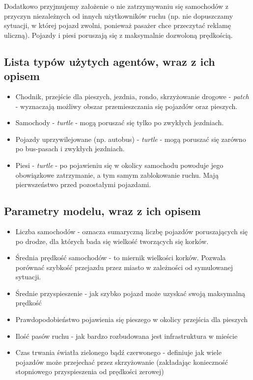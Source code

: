 \documentclass{article}
\begin{document}
Dodatkowo przyjmujemy założenie o nie zatrzymywaniu się samochodów z przyczyn niezależnych od innych użytkowników ruchu (np. nie dopuszczamy sytuacji, w której pojazd zwolni, ponieważ pasażer chce przeczytać reklamę uliczną). Pojazdy i piesi poruszają się z maksymalnie dozwoloną prędkością.

\subsection{Lista typów użytych agentów, wraz z ich opisem}
\begin{itemize}
    \item Chodnik, przejście dla pieszych, jezdnia, rondo, skrzyżowanie drogowe - \textit{patch} - wyznaczają możliwy obszar przemieszczania się pojazdów oraz pieszych.
    \item Samochody - \textit{turtle} - mogą poruszać się tylko po zwykłych jezdniach.
    \item Pojazdy uprzywilejowane (np. autobus) - \textit{turtle} - mogą poruszać się zarówno po bus-pasach i zwykłych jezdniach.
    \item Piesi - \textit{turtle} - po pojawieniu się w okolicy samochodu powoduje jego obowiązkowe zatrzymanie, a tym samym zablokowanie ruchu. Mają pierwszeństwo przed pozostałymi pojazdami.
\end{itemize}

\subsection{Parametry modelu, wraz z ich opisem}
\begin{itemize}
    \item Liczba samochodów - oznacza sumaryczną liczbę pojazdów poruszających się po drodze, dla których bada się wielkość tworzących się korków.
    \item Średnia prędkość samochodów - to miernik wielkości korków. Pozwala porównać szybkość przejazdu przez miasto w zależności od symulowanej sytuacji.
    \item Średnie przyspieszenie - jak szybko pojazd może uzyskać swoją maksymalną prędkość 
    \item Prawdopodobieństwo pojawienia się pieszego w okolicy przejścia dla pieszych
    \item Ilość pasów ruchu - jak bardzo rozbudowana jest infrastruktura w mieście
    \item Czas trwania światła zielonego bądź czerwonego - definiuje jak wiele pojazdów może przejechać przez skrzyżowanie (zakładając konieczność stopniowego przyspieszenia od prędkości zerowej)
\end{itemize}
\end{document}
